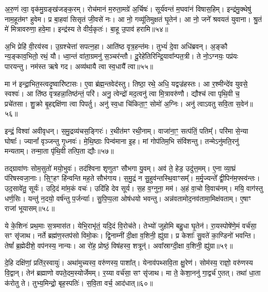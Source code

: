 अ॒रु॒णं त्वा॒ वृक॑मु॒ग्रङ्ख॑जङ्क॒रम्।
रोच॑मानं म॒रुता॒मग्रे॑ अ॒र्चिषः॑।
सूर्य॑वन्तं म॒घवा॑नं विषास॒हिम्।
इन्द्र॑मु॒क्थेषु॑ नाम॒हूत॑मꣳ हुवेम।
प्र बा॒हवा॑ सिसृतं जी॒वसे॑ नः।
आ नो॒ गव्यू॑तिमुक्षतं घृ॒तेन॑।
आ नो॒ जने᳚ श्रवयतं युवाना।
श्रु॒तं मे॑ मित्रावरुणा॒ हवे॒मा।
इन्द्र॑स्य ते वीर्य॒कृतः॑।
बा॒हू उ॒पाव॑ हरामि॥५४॥\anuvakamend[ब॒भू॒वाव्य॑य॒त्तेने॒मम॑ग्न इ॒ह वर्च॑सा॒ सम॑ङ्ग्धि॒ वैया॒घ्रेऽधि॑ राष्ट्र॒वर्ध॑नः॒ पाङ्क्ते॑न॒ छन्द॑सो॒पाव॑हरामि]

अ॒भि प्रेहि॑ वी॒रय॑स्व।
उ॒ग्रश्चेत्ता॑ सपत्न॒हा।
आति॑ष्ठ वृत्र॒हन्त॑मः।
तुभ्यं॑ दे॒वा अधि॑ब्रवन्।
अ॒ङ्कौ न्य॒ङ्काव॒भितो॒ रथं॒ यौ।
ध्वा॒न्तं वा॑ता॒ग्रमनु॑ स॒ञ्चर॑न्तौ।
दू॒रेहे॑तिरिन्द्रि॒यावा᳚न्पत॒त्री।
ते नो॒\-ऽग्नयः॒ पप्र॑यः पारयन्तु।
नम॑स्त ऋषे गद।
अव्य॑थायै त्वा स्व॒धायै᳚ त्वा॥५५॥

मा न॑ इन्द्रा॒भित॒स्त्वदृ॒ष्वारि॑ष्टासः।
ए॒वा ब्र॑ह्म॒न्तवेद॑स्तु।
तिष्ठा॒ रथे॒ अधि॒ यद्वज्र॑हस्तः।
आ र॒श्मीन्दे॑व युवसे॒ स्वश्वः॑।
आ ति॑ष्ठ वृत्रहन्ना॒तिष्ठ॑न्तं॒ परि॑।
अनु॒ त्वेन्द्रो॑ मद॒त्वनु॑ त्वा मि॒त्रावरु॑णौ।
द्यौश्च॑ त्वा पृथि॒वी च॒ प्रचे॑तसा।
शु॒क्रो बृ॒हद्दक्षि॑णा त्वा पिपर्तु।
अनु॑ स्व॒धा चि॑किता॒ꣳ॒ सोमो॑ अ॒ग्निः।
अनु॑ त्वाऽवतु सवि॒ता स॒वेन॑॥५६॥

इन्द्रं॒ विश्वा॑ अवीवृधन्।
स॒मु॒द्रव्य॑चस॒ङ्गिरः॑।
र॒थीत॑मꣳ रथी॒नाम्।
वाजा॑ना॒ꣳ॒ सत्प॑तिं॒ पतिम्᳚।
परि॑मा से॒न्या घोषाः᳚।
ज्यानां᳚ वृञ्जन्तु गृ॒ध्नवः॑।
मे॒थि॒ष्ठाः पिन्व॑माना इ॒ह।
मां गोप॑तिम॒भि संवि॑शन्तु।
तन्मे\-ऽनु॑मति॒रनु॑\- मन्यताम्।
तन्मा॒ता पृ॑थि॒वी तत्पि॒ता द्यौः॥५७॥

तद्ग्रावा॑णः सोम॒सुतो॑ मयो॒भुवः॑।
तद॑श्विना शृणुतꣳ सौभगा यु॒वम्।
अव॑ ते॒ हेड॒ उदु॑त्त॒मम्।
ए॒ना व्या॒घ्रं प॑रिषस्वजा॒नाः।
सि॒ꣳ॒हꣳ हि॑न्वन्ति मह॒ते सौभ॑गाय।
स॒मु॒द्रं न सु॒हुव॑न्तस्थि॒वाꣳसम्᳚।
म॒र्मृ॒ज्यन्ते᳚ द्वी॒पिन॑म॒फ्स्व॑न्तः।
उद॒सावे॑तु॒ सूर्यः॑।
उदि॒दं मा॑म॒कं वचः॑।
उदि॑हि देव सूर्य।
स॒ह व॒ग्नुना॒ मम॑।
अ॒हं वा॒चो वि॒वाच॑नम्।
मयि॒ वाग॑स्तु धर्ण॒सिः।
यन्तु॑ न॒दयो॒ वर्\mbox{}ष॑न्तु प॒र्जन्याः᳚।
सु॒पि॒प्प॒ला ओष॑धयो भवन्तु।
अन्न॑वतामोद॒नव॑तामा॒मिक्ष॑वताम्।
ए॒षाꣳ राजा॑ भूयासम्॥५८॥\anuvakamend[स्व॒धायै᳚ त्वा स॒वेन॒ द्यौः सू᳚र्य स॒प्त च॑]

ये के॒शिनः॑ प्रथ॒माः स॒त्रमास॑त।
येभि॒राभृ॑तं॒ यदि॒दं वि॒रोच॑ते।
तेभ्यो॑ जुहोमि बहु॒धा घृ॒तेन॑।
रा॒यस्पोषे॑णे॒मं वर्च॑सा॒ सꣳ सृ॑जाथ।
नर्ते ब्रह्म॑ण॒स्तप॑सो विमो॒कः।
द्वि॒नाम्नी॑ दी॒क्षा व॒शिनी॒ ह्यु॑ग्रा।
प्र केशाः᳚ सु॒वते॑ का॒ण्डिनो॑ भवन्ति।
तेषां᳚ ब्र॒ह्मेदीशे॒ वप॑नस्य॒ नान्यः।
आ रो॑ह॒ प्रोष्ठं॒ विष॑हस्व॒ शत्रून्॑।
अवा᳚स्राग्दी॒क्षा व॒शिनी॒ ह्यु॑ग्रा॥५९॥

दे॒हि दक्षि॑णां॒ प्रति॑\-र॒स्वायुः॑।
अथा॑मुच्यस्व॒ वरु॑णस्य॒ पाशा᳚त्।
येनाव॑पथ्सवि॒ता क्षु॒रेण॑।
सोम॑स्य॒ राज्ञो॒ वरु॑णस्य वि॒द्वान्।
तेन॑ ब्रह्माणो वपते॒दम॒स्योर्जेमम्।
र॒य्या वर्च॑सा॒ सꣳ सृ॑जाथ।
मा ते॒ केशा॒ननु॑ गा॒द्वर्च॑ ए॒तत्।
तथा॑ धा॒ता क॑रोतु ते।
तुभ्य॒मिन्द्रो॒ बृह॒स्पतिः॑।
स॒वि॒ता वर्च॒ आद॑धात्॥६०॥

